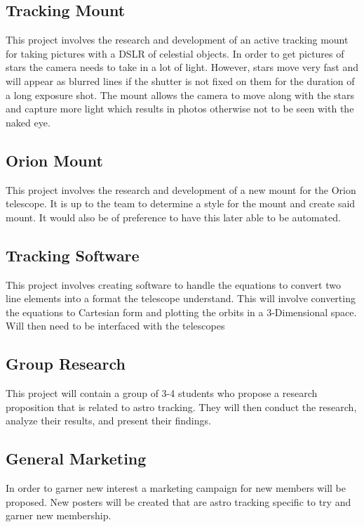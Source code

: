 \documentclass[conference]{IEEEtran} %
\begin{document}
    \subsection{Tracking Mount}
    \label{subsec:trackingmount}
        This project involves the research and development of an active tracking mount for taking pictures with a DSLR of celestial objects.  In order to get pictures of stars the camera needs to take in a lot of light.  However, stars move very fast and will appear as blurred lines if the shutter is not fixed on them for the duration of a long exposure shot.  The mount allows the camera to move along with the stars and capture more light which results in photos otherwise not to be seen with the naked eye.
    \subsection{Orion Mount}
    \label{subsec:orionmount}
        This project involves the research and development of a new mount for the Orion telescope.  It is up to the team to determine a style for the mount and create said mount.  It would also be of preference to have this later able to be automated.
    \subsection{Tracking Software}
    \label{subsec:trackingsoftware}
        This project involves creating software to handle the equations to convert two line elements into a format the telescope understand.  This will involve converting the equations to Cartesian form and plotting the orbits in a 3-Dimensional space.  Will then need to be interfaced with the telescopes
    \subsection{Group Research}
    \label{subsec:groupresearch}
        This project will contain a group of 3-4 students who propose a research proposition that is related to astro tracking.  They will then conduct the research, analyze their results, and present their findings.
    \subsection{General Marketing}
    \label{subsec:generalmarketing}
        In order to garner new interest a marketing campaign for new members will be proposed. New posters will be created that are astro tracking specific to try and garner new membership.
\end{document}
